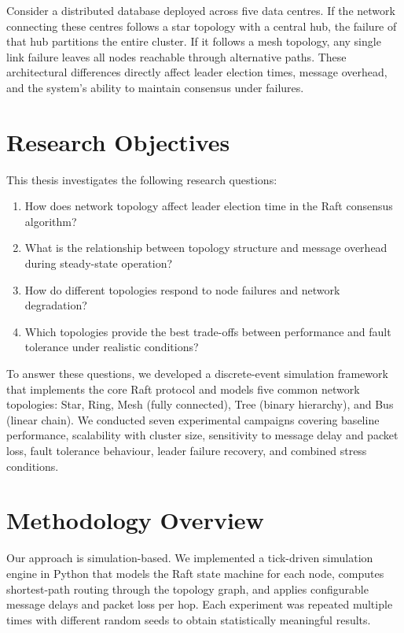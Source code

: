 Consider a distributed database deployed across five data centres. If the network connecting these centres follows a star topology with a central hub, the failure of that hub partitions the entire cluster. If it follows a mesh topology, any single link failure leaves all nodes reachable through alternative paths. These architectural differences directly affect leader election times, message overhead, and the system's ability to maintain consensus under failures.

\section{Research Objectives}

This thesis investigates the following research questions:

\begin{enumerate}
    \item How does network topology affect leader election time in the Raft consensus algorithm?
    \item What is the relationship between topology structure and message overhead during steady-state operation?
    \item How do different topologies respond to node failures and network degradation?
    \item Which topologies provide the best trade-offs between performance and fault tolerance under realistic conditions?
\end{enumerate}

To answer these questions, we developed a discrete-event simulation framework that implements the core Raft protocol and models five common network topologies: Star, Ring, Mesh (fully connected), Tree (binary hierarchy), and Bus (linear chain). We conducted seven experimental campaigns covering baseline performance, scalability with cluster size, sensitivity to message delay and packet loss, fault tolerance behaviour, leader failure recovery, and combined stress conditions.

\section{Methodology Overview}

Our approach is simulation-based. We implemented a tick-driven simulation engine in Python that models the Raft state machine for each node, computes shortest-path routing through the topology graph, and applies configurable message delays and packet loss per hop. Each experiment was repeated multiple times with different random seeds to obtain statistically meaningful results.

